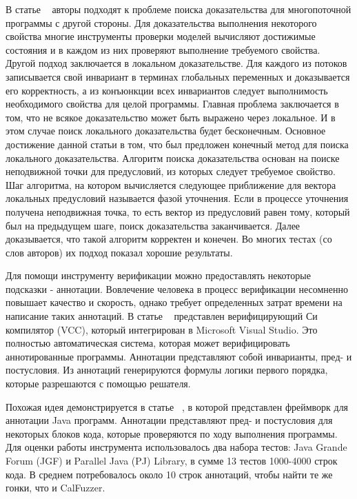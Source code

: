 В статье ~\cite{Cohen:2009} авторы подходят к проблеме поиска доказательства для многопоточной программы с другой стороны. 
Для доказательства выполнения некоторого свойства многие инструменты проверки моделей вычисляют достижимые состояния и в каждом из них проверяют выполнение требуемого свойства. Другой подход заключается в локальном доказательстве. Для каждого из потоков записывается свой инвариант в терминах глобальных переменных и доказывается его корректность, а из конъюнкции всех инвариантов следует выполнимость необходимого свойства для целой программы. 
Главная проблема заключается в том, что не всякое доказательство может быть выражено через локальное. И в этом случае поиск локального доказательства будет бесконечным. Основное достижение данной статьи в том, что был предложен конечный метод для поиска локального доказательства. 
Алгоритм поиска доказательства основан на поиске неподвижной точки для предусловий, из которых следует требуемое свойство. Шаг алгоритма, на котором вычисляется следующее приближение для вектора локальных предусловий называется фазой уточнения. Если в процессе уточнения получена неподвижная точка, то есть вектор из предусловий равен тому, который был на предыдущем шаге, поиск доказательства заканчивается. Далее доказывается, что такой алгоритм корректен и конечен. 
Во многих тестах (со слов авторов) их подход показал хорошие результаты. 

Для помощи инструменту верификации можно предоставлять некоторые подсказки - аннотации. Вовлечение человека в процесс верификации несомненно повышает качество и скорость, однако требует определенных затрат времени на написание таких аннотаций. 
В статье ~\cite{VCC:2009} представлен верифицирующий Си компилятор (VCC), который интегрирован в Microsoft Visual Studio. Это полностью автоматическая система, которая может верифицировать аннотированные программы. Аннотации представляют собой инварианты, пред- и постусловия. Из аннотаций генерируются формулы логики первого порядка, которые разрешаются с помощью решателя.

Похожая идея демонстрируется в статье ~\cite{Burnim:2009}, в которой представлен фреймворк для аннотации Java программ. Аннотации представляют пред- и постусловия для некоторых блоков кода, которые проверяются по ходу выполнения программы. 
Для оценки работы инструмента использовалось два набора тестов: Java Grande Forum (JGF) и Parallel Java (PJ) Library, в сумме 13 тестов 1000-4000 строк кода. В среднем потребовалось около 10 строк аннотаций, чтобы найти те же гонки, что и CalFuzzer. 

